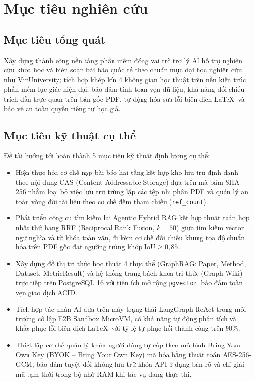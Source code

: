 \section{Mục tiêu nghiên cứu}
\label{sec:muc_tieu}

\subsection{Mục tiêu tổng quát}
\label{subsec:muc_tieu_tong_quat}
Xây dựng thành công nền tảng phần mềm \VS đóng vai trò trợ lý AI hỗ trợ nghiên cứu khoa học và biên soạn bài báo quốc tế theo chuẩn mực đại học nghiên cứu như VinUniversity; tích hợp khép kín 4 không gian học thuật trên nền kiến trúc phần mềm lục giác hiện đại; bảo đảm tính toàn vẹn dữ liệu, khả năng đối chiếu trích dẫn trực quan trên bản gốc PDF, tự động hóa sửa lỗi biên dịch \LaTeX\ và bảo vệ an toàn quyền riêng tư học giả.

\subsection{Mục tiêu kỹ thuật cụ thể}
\label{subsec:muc_tieu_cu_the}
Đề tài hướng tới hoàn thành 5 mục tiêu kỹ thuật định lượng cụ thể:
\begin{itemize}
    \item Hiện thực hóa cơ chế nạp bài báo hai tầng kết hợp kho lưu trữ định danh theo nội dung CAS (Content-Addressable Storage) dựa trên mã băm SHA-256 nhằm loại bỏ việc lưu trữ trùng lặp các tệp nhị phân PDF và quản lý an toàn vòng đời tài liệu theo cơ chế đếm tham chiếu (\texttt{ref\_count}).
    \item Phát triển công cụ tìm kiếm lai Agentic Hybrid RAG kết hợp thuật toán hợp nhất thứ hạng RRF (Reciprocal Rank Fusion, $k=60$) giữa tìm kiếm vector ngữ nghĩa và từ khóa toàn văn, đi kèm cơ chế đối chiếu khung tọa độ chuẩn hóa trên PDF gốc đạt ngưỡng trùng khớp $\text{IoU} \ge 0{,}85$.
    \item Xây dựng đồ thị tri thức học thuật 4 thực thể (GraphRAG: Paper, Method, Dataset, MetricResult) và hệ thống trang bách khoa tri thức (Graph Wiki) trực tiếp trên PostgreSQL 16 với tiện ích mở rộng \texttt{pgvector}, bảo đảm toàn vẹn giao dịch ACID.
    \item Tích hợp tác nhân AI dựa trên máy trạng thái LangGraph ReAct trong môi trường cô lập E2B Sandbox MicroVM, có khả năng tự động phân tích và khắc phục lỗi biên dịch \LaTeX\ với tỷ lệ tự phục hồi thành công trên 90\%.
    \item Thiết lập cơ chế quản lý khóa người dùng tự cấp theo mô hình Bring Your Own Key (BYOK -- Bring Your Own Key) mã hóa bằng thuật toán AES-256-GCM, bảo đảm tuyệt đối không lưu trữ khóa API ở dạng bản rõ và chỉ giải mã tạm thời trong bộ nhớ RAM khi tác vụ đang thực thi.
\end{itemize}
